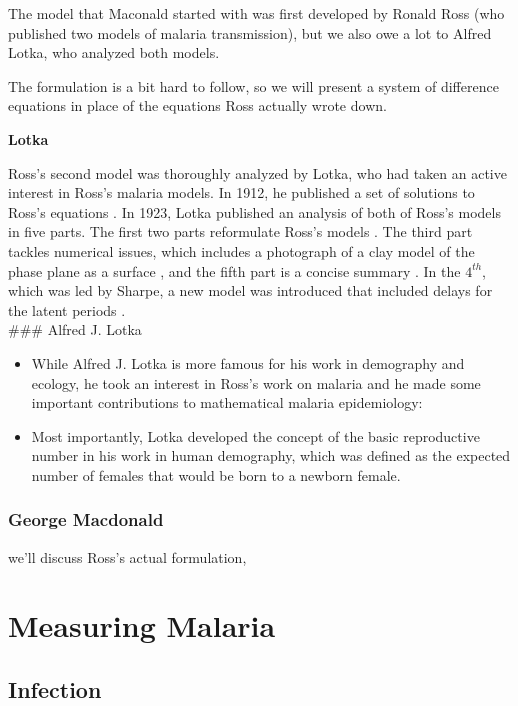 \documentclass[
]{book}
\begin{document}
The model that Maconald started with was first developed by
Ronald Ross (who published two models of malaria transmission), but we also owe a lot to Alfred Lotka, who analyzed both models.

The formulation is a bit hard to follow, so we will present a system of difference equations in place of the equations Ross actually wrote down.

\textbf{Lotka}

Ross's second model was thoroughly analyzed by Lotka, who had taken an active interest in Ross's malaria models. In 1912, he published a set of solutions to Ross's equations \autocite{LotkaAJ1912Nature}. In 1923, Lotka published an analysis of both of Ross's models in five parts. The first two parts reformulate Ross's models \autocite{LotkaAJ1923part1,LotkaAJ1923part2}. The third part tackles numerical issues, which includes a photograph of a clay model of the phase plane as a surface \autocite{LotkaAJ1923part3}, and the fifth part is a concise summary \autocite{LotkaAJ1923part5}. In the \(4^{th}\), which was led by Sharpe, a new model was introduced that included delays for the latent periods \autocite{LotkaAJ1923part4}.\\
\#\#\# Alfred J. Lotka

\begin{itemize}
\item
  While Alfred J. Lotka is more famous for his work in demography and ecology, he took an interest in Ross's work on malaria and he made some important contributions to mathematical malaria epidemiology:
\item
  Most importantly, Lotka developed the concept of the basic reproductive number in his work in human demography, which was defined as the expected number of females that would be born to a newborn female.
\end{itemize}

\subsection{George Macdonald}\label{george-macdonald}

we'll discuss Ross's actual formulation,

\chapter{Measuring Malaria}\label{measuring-malaria}

\section{Infection}\label{infection}
\end{document}
